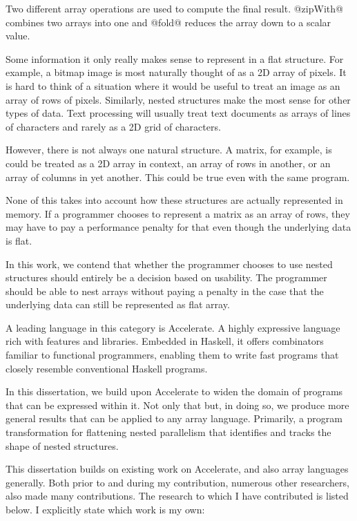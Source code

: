 Two different array operations are used to compute the final result. @zipWith@ combines two arrays into one and @fold@ reduces the array down to a scalar value.

Some information it only really makes sense to represent in a flat structure. For example, a bitmap image is most naturally thought of as a 2D array of pixels. It is hard to think of a situation where it would be useful to treat an image as an array of rows of pixels. Similarly, nested structures make the most sense for other types of data. Text processing will usually treat text documents as arrays of lines of characters and rarely as a 2D grid of characters.

However, there is not always one natural structure. A matrix, for example, is could be treated as a 2D array in context, an array of rows in another, or an array of columns in yet another. This could be true even with the same program.

None of this takes into account how these structures are actually represented in memory. If a programmer chooses to represent a matrix as an array of rows, they may have to pay a performance penalty for that even though the underlying data is flat.

In this work, we contend that whether the programmer chooses to use nested structures should entirely be a decision based on usability. The programmer should be able to nest arrays without paying a penalty in the case that the underlying data can still be represented as flat array.

A leading language in this category is Accelerate. A highly expressive language rich with features and libraries. Embedded in Haskell, it offers combinators familiar to functional programmers, enabling them to write fast programs that closely resemble conventional Haskell programs.


In this dissertation, we build upon Accelerate to widen the domain of programs that can be expressed within it. Not only that but, in doing so, we produce more general results that can be applied to any array language. Primarily, a program transformation for flattening nested parallelism that identifies and tracks the shape of nested structures.

This dissertation builds on existing work on Accelerate, and also array languages generally. Both prior to and during my contribution, numerous other researchers, also made many contributions. The research to which I have contributed is listed below. I explicitly state which work is my own:

